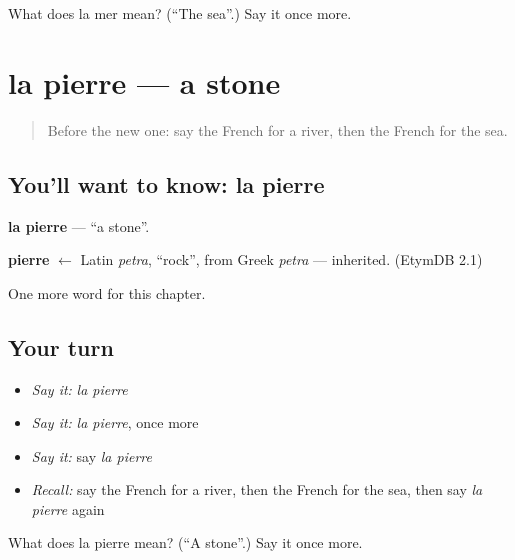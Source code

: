 \begin{tcolorbox}[breakable,colback=teal!4,colframe=teal!35!black,title={Before you move on}]
What does la mer mean? (\textquotedblleft{}The sea\textquotedblright{}.) Say it once more.
\end{tcolorbox}
\section[la pierre]{la pierre — a stone}

\label{lesson:FR-C82-pierre}



\begin{quote}
Before the new one: say the French for a river, then the French for the sea.
\end{quote}

\subsection*{You'll want to know: la pierre}
\textbf{la pierre} — \textquotedblleft{}a stone\textquotedblright{}.

\begin{cousinweb}
\textbf{pierre} $\leftarrow$ Latin \emph{petra}, \textquotedblleft{}rock\textquotedblright{}, from Greek \emph{petra} — inherited. (EtymDB 2.1)
\end{cousinweb}

\begin{grammarlens}[title={What you've built}]
One more word for this chapter.
\end{grammarlens}

\subsection*{Your turn}
\begin{itemize}
\raggedright
  \item \emph{Say it:} \emph{la pierre}
  \item \emph{Say it:} \emph{la pierre}, once more
  \item \emph{Say it:} say \emph{la pierre}
  \item \emph{Recall:} say the French for a river, then the French for the sea, then say \emph{la pierre} again
\end{itemize}

\begin{tcolorbox}[breakable,colback=teal!4,colframe=teal!35!black,title={Before you move on}]
What does la pierre mean? (\textquotedblleft{}A stone\textquotedblright{}.) Say it once more.
\end{tcolorbox}
